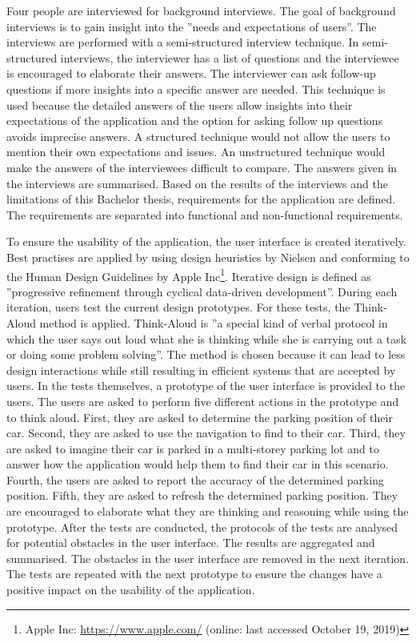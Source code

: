 Four people are interviewed for background interviews. The goal of background interviews is to gain insight into the ''needs and expectations of users''. The interviews are performed with a semi-structured interview technique. In semi-structured interviews, the interviewer has a list of questions and the interviewee is encouraged to elaborate their answers. The interviewer can ask follow-up questions if more insights into a specific answer are needed. This technique is used because the detailed answers of the users allow insights into their expectations of the application and the option for asking follow up questions avoids imprecise answers. A structured technique would not allow the users to mention their own expectations and issues. An unstructured technique would make the answers of the interviewees difficult to compare. The answers given in the interviews are summarised. Based on the results of the interviews and the limitations of this Bachelor thesis, requirements for the application are defined. The requirements are separated into functional and non-functional requirements. \cite{Abras2004} \cite{wilson2013interview}

To ensure the usability of the application, the user interface is created iteratively. Best practises are applied by using design heuristics by Nielsen and conforming to the Human Design Guidelines by Apple Inc\footnote{Apple Inc: \url{https://www.apple.com/} (online: last accessed October 19, 2019)}. Iterative design is defined as ''progressive refinement through cyclical data-driven development''. During each iteration, users test the current design prototypes. For these tests, the Think-Aloud method is applied. Think-Aloud is ''a special kind of verbal protocol in which the user says out loud what she is thinking while she is carrying out a task or doing some problem solving''. The method is chosen because it can lead to less design interactions while still resulting in efficient systems that are accepted by users. In the tests themselves, a prototype of the user interface is provided to the users. The users are asked to perform five different actions in the prototype and to think aloud. First, they are asked to determine the parking position of their car. Second, they are asked to use the navigation to find to their car. Third, they are asked to imagine their car is parked in a multi-storey parking lot and to answer how the application would help them to find their car in this scenario. Fourth, the users are asked to report the accuracy of the determined parking position. Fifth, they are asked to refresh the determined parking position. They are encouraged to elaborate what they are thinking and reasoning while using the prototype. After the tests are conducted, the protocols of the tests are analysed for potential obstacles in the user interface. The results are aggregated and summarised. The obstacles in the user interface are removed in the next iteration. The tests are repeated with the next prototype to ensure the changes have a positive impact on the usability of the application. \cite{Abras2004} \cite{goodman2012observing} \cite{nielsen1994usability} \cite{heurisitcNielsen} \cite{apple:interfaceguidliines} \cite{jaspers2004think} 

